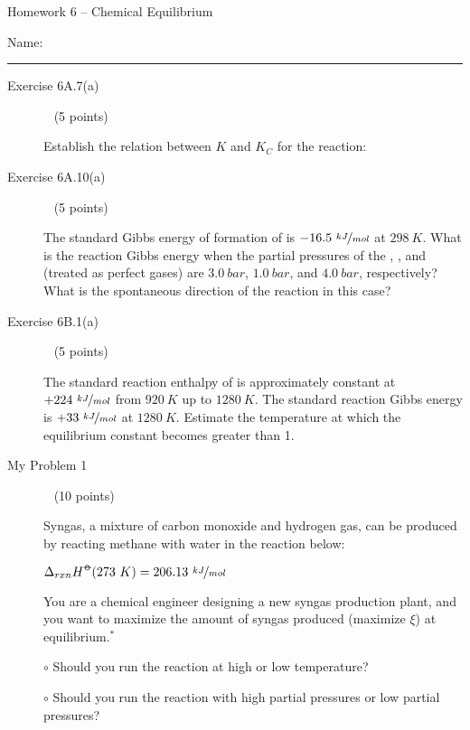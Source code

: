 \documentclass[12pt, openany, letterpaper]{memoir}
\begin{document}
\begin{center}
	{\large Homework 6 -- Chemical Equilibrium}
\end{center}

Name: \rule[-.1mm]{15em}{0.1pt}

\begin{description}
	\item [Exercise 6A.7(a)] ~ (5 points)

	      Establish the relation between $K$ and $K_C$ for the reaction: 

	      \vspace{18em}
	\item [Exercise 6A.10(a)] ~ (5 points)

	      The standard Gibbs energy of formation of  is $-16.5~\nicefrac{kJ}{mol}$ at $298~K$. What is the reaction Gibbs energy when the partial pressures of the , , and  (treated as perfect gases) are $3.0~bar$, $1.0~bar$, and $4.0~bar$, respectively? What is the spontaneous direction of the reaction in this case?

	      \vspace{20em}
	\item [Exercise 6B.1(a)] ~ (5 points)

	      The standard reaction enthalpy of  is approximately constant at $+224~\nicefrac{kJ}{mol}$ from $920~K$ up to $1280~K$. The standard reaction Gibbs energy is $+33~\nicefrac{kJ}{mol}$ at $1280~K$. Estimate the temperature at which the equilibrium constant becomes greater than 1.

	      \vspace{20em}
	\item [My Problem 1] ~ (10 points)

	      Syngas, a mixture of carbon monoxide and hydrogen gas, can be produced by reacting methane with water in the reaction below:

	       \hspace{2em} $\Delta_{rxn}H^{\std}(273~K)=206.13~\nicefrac{kJ}{mol}$

	      \noindent You are a chemical engineer designing a new syngas production plant, and you want to maximize the amount of syngas produced (maximize $\xi$) at equilibrium.$^*$

	      \noindent $\circ$ Should you run the reaction at high or low temperature?

	      \vspace{7em}
	      \noindent $\circ$ Should you run the reaction with high partial pressures or low partial pressures?


\end{description}
\end{document}
